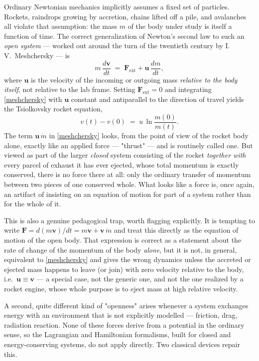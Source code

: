 Ordinary Newtonian mechanics implicitly assumes a fixed set of
particles. Rockets, raindrops growing by accretion, chains lifted
off a pile, and avalanches all violate that assumption: the mass $m$
of the body under study is itself a function of time. The correct
generalization of Newton's second law to such an \emph{open system}
--- worked out around the turn of the twentieth century by
I.\,V.\ Meshchersky --- is
\begin{equation}
  m\,\frac{d\mathbf v}{dt} \;=\; \mathbf F_{\mathrm{ext}}
  + \mathbf u\,\frac{dm}{dt} ,
  \label{meshchersky}
\end{equation}
where $\mathbf u$ is the velocity of the incoming or outgoing mass
\emph{relative to the body itself}, not relative to the lab frame.
Setting $\mathbf F_{\mathrm{ext}}=0$ and integrating
\eqref{meshchersky} with $\mathbf u$ constant and antiparallel to
the direction of travel yields the Tsiolkovsky rocket equation,
\begin{equation}
  v(t) - v(0) \;=\; u\,\ln\frac{m(0)}{m(t)} .
  \label{tsiolkovsky}
\end{equation}
 The
term $\mathbf u\,\dot m$ in \eqref{meshchersky} looks, from the
point of view of the rocket body alone, exactly like an applied
force --- "thrust" --- and is routinely called one. But viewed as
part of the larger \emph{closed} system consisting of the rocket
\emph{together with} every parcel of exhaust it has ever ejected,
whose total momentum is exactly conserved, there is no force there
at all: only the ordinary transfer of momentum between two pieces of
one conserved whole. What looks like a force is, once again, an
artifact of insisting on an equation of motion for part of a system
rather than for the whole of it.

This is also a genuine pedagogical trap, worth flagging explicitly.
It is tempting to write $\mathbf F = d(m\mathbf v)/dt = m\dot{\mathbf
v} + \mathbf v\,\dot m$ and treat this directly as the equation of
motion of the open body. That expression is correct as a statement
about the rate of change of the momentum of the body \emph{alone},
but it is not, in general, equivalent to \eqref{meshchersky} and
gives the wrong dynamics unless the accreted or ejected mass happens
to leave (or join) with zero velocity relative to the body, i.e.\
$\mathbf u \equiv \mathbf v$ --- a special case, not the generic one,
and not the one realized by a rocket engine, whose whole purpose is
to eject mass at high relative velocity.


A second, quite different kind of "openness" arises whenever a
system exchanges energy with an environment that is not explicitly
modelled --- friction, drag, radiation reaction. None of these
forces derive from a potential in the ordinary sense, so the
Lagrangian and Hamiltonian formalisms, built for closed and
energy-conserving systems, do not apply directly. Two classical
devices repair this.

